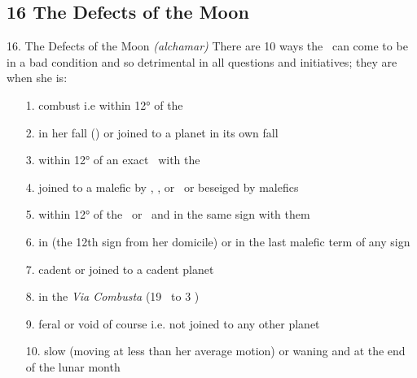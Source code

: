 \subsection{16 The Defects of the Moon}
\begin{frame}[t]{16. The Defects of the Moon}
\textsl{(alchamar)} There are 10 ways the \Moon\ can come to be in a bad condition and so detrimental in all questions and initiatives; they are when she is:
\begin{enumerate}
\item[1.] combust i.e within 12° of the \Sun
\item[2.] in her fall (\Capricorn) or joined to a planet in its own fall
\item[3.] within 12° of an exact \Opposition\ with the \Sun
\item[4.] joined to a malefic by \Conjunction, \Square, or \Opposition\ or beseiged by malefics
\item[5.] within 12° of the \NorthNode\ or \SouthNode\ and in the same sign with them
\item[6.] in \Gemini (the 12th sign from her domicile) or in the last malefic term of any sign
\item[7.] cadent or joined to a cadent planet
\item[8.] in the \textsl{Via Combusta}  (19 \Libra\ to 3 \Scorpio)
\item[9.] feral or void of course i.e. not joined to any other planet
\item[10.] slow (moving at less than her average motion) or waning and at the end of the lunar month
\end{enumerate}
\end{frame}
